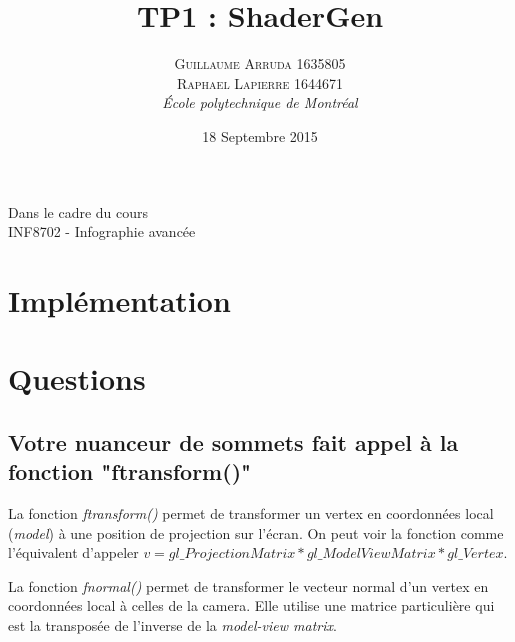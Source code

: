 \documentclass[a4paper, 12pt]{article} %
\title{TP1 : ShaderGen}
\author{\textsc{Guillaume Arruda 1635805\\Raphael Lapierre 1644671} %
\vspace{10pt}
\\{\textit{École polytechnique de Montréal}}} %
\date{18 Septembre 2015} %
\makeatletter
\renewcommand{\maketitle}{ %
\begin{center} %

\vspace*{25pt} %
{\LARGE\@title} %

\vspace{125pt} %

{\large\@author} %

\vspace{125pt} %
Dans le cadre du cours
\\INF8702 - Infographie avancée
\vspace{125pt} %
\\\@date %
\vspace{125pt} %

\end{center}
}
\makeatother
\begin{document}
\thispagestyle{empty}
\clearpage\maketitle %
\pagebreak[4]

\setlength{\headheight}{15.0pt}
\pagestyle{fancy}
\fancyhead[C]{}

\section*{Implémentation}

\section*{Questions}

\subsection*{Votre nuanceur de sommets fait appel à la fonction "ftransform()"}
\begin{description}[style=nextline]
    \item[Que fait cette fonction?]
        La fonction \textit{ftransform()} permet de transformer un vertex en coordonnées
        local (\textit{model}) à une position de projection sur l'écran. On peut voir la fonction
        comme l'équivalent d'appeler $v = gl\_ProjectionMatrix * gl\_ModelViewMatrix *
        gl\_Vertex $.
    \item[Que fait alors la fonction fnormal()?]
        La fonction \textit{fnormal()} permet de transformer le vecteur normal d'un vertex
        en coordonnées local à celles de la camera. Elle utilise une matrice particulière
        qui est la transposée de l'inverse de la \textit{model-view matrix}.
\end{description}
\end{document}
